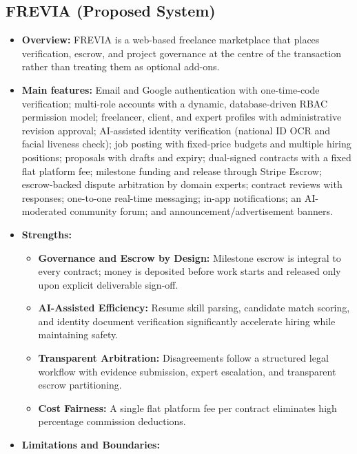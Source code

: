 \subsection{FREVIA (Proposed System)}

\begin{itemize}[leftmargin=*]
\item \textbf{Overview:} FREVIA is a web-based freelance marketplace that places verification, escrow, and project governance at the centre of the transaction rather than treating them as optional add-ons.
\item \textbf{Main features:} Email and Google authentication with one-time-code verification; multi-role accounts with a dynamic, database-driven RBAC permission model; freelancer, client, and expert profiles with administrative revision approval; AI-assisted identity verification (national ID OCR and facial liveness check); job posting with fixed-price budgets and multiple hiring positions; proposals with drafts and expiry; dual-signed contracts with a fixed flat platform fee; milestone funding and release through Stripe Escrow; escrow-backed dispute arbitration by domain experts; contract reviews with responses; one-to-one real-time messaging; in-app notifications; an AI-moderated community forum; and announcement/advertisement banners.
\item \textbf{Strengths:} 
    \begin{itemize}[leftmargin=*]
        \item \textbf{Governance and Escrow by Design:} Milestone escrow is integral to every contract; money is deposited before work starts and released only upon explicit deliverable sign-off.
        \item \textbf{AI-Assisted Efficiency:} Resume skill parsing, candidate match scoring, and identity document verification significantly accelerate hiring while maintaining safety.
        \item \textbf{Transparent Arbitration:} Disagreements follow a structured legal workflow with evidence submission, expert escalation, and transparent escrow partitioning.
        \item \textbf{Cost Fairness:} A single flat platform fee per contract eliminates high percentage commission deductions.
    \end{itemize}
\item \textbf{Limitations and Boundaries:}
    \begin{itemize}[leftmargin=*]

\end{itemize}
\end{itemize}

